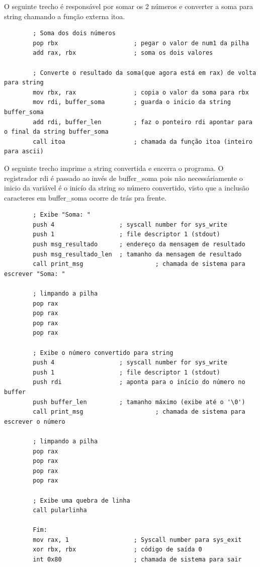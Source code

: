 \documentclass[12pt, openany, oneside, a4paper, brazil]{abntex2}
\begin{document}
	O seguinte trecho é responsável por somar os 2 números e converter a soma para string chamando a função externa itoa.
	
	\begin{verbatim}
		; Soma dos dois números
		pop rbx                     ; pegar o valor de num1 da pilha
		add rax, rbx                ; soma os dois valores
		
		; Converte o resultado da soma(que agora está em rax) de volta para string
		mov rbx, rax                ; copia o valor da soma para rbx
		mov rdi, buffer_soma        ; guarda o inicio da string buffer_soma
		add rdi, buffer_len         ; faz o ponteiro rdi apontar para o final da string buffer_soma
		call itoa                   ; chamada da função itoa (inteiro para ascii)
	\end{verbatim}
	
	O seguinte trecho imprime a string convertida e encerra o programa. O registrador rdi é passado ao invés de buffer\_soma pois não necessáriamente o inicio da variável é o inicío da string so número convertido, visto que a inclusão caracteres em buffer\_soma ocorre de trás pra frente.
	
	\begin{verbatim}
		; Exibe "Soma: "
		push 4                  ; syscall number for sys_write
		push 1                  ; file descriptor 1 (stdout)
		push msg_resultado      ; endereço da mensagem de resultado
		push msg_resultado_len  ; tamanho da mensagem de resultado
		call print_msg                    ; chamada de sistema para escrever "Soma: "
		
		; limpando a pilha
		pop rax
		pop rax
		pop rax
		pop rax
		
		; Exibe o número convertido para string
		push 4                  ; syscall number for sys_write
		push 1                  ; file descriptor 1 (stdout)
		push rdi                ; aponta para o início do número no buffer
		push buffer_len         ; tamanho máximo (exibe até o '\0')
		call print_msg                    ; chamada de sistema para escrever o número
		
		; limpando a pilha
		pop rax
		pop rax
		pop rax
		pop rax
		
		; Exibe uma quebra de linha
		call pularlinha
		
		Fim:
		mov rax, 1                  ; Syscall number para sys_exit
		xor rbx, rbx                ; código de saída 0
		int 0x80                    ; chamada de sistema para sair
	\end{verbatim}
	
\end{document}
